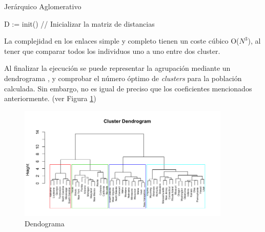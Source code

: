 		\begin{algorithm}[!h]
			\caption{Jerárquico Aglomerativo}
			D := init() // Inicializar la matriz de distancias\\
			
		\end{algorithm}
		\vspace{-0.20cm}

		\noindent La complejidad en los enlaces simple y completo tienen un coste cúbico O(\(N^{3}\)), al tener que comparar todos los individuos uno a uno entre dos cluster.
		
		\newpage


		Al finalizar la ejecución se puede representar la agrupación mediante un dendrograma \cite{espinoza2012using}, y comprobar el número óptimo de \textit{clusters} para la población calculada. Sin embargo, no es igual de preciso que los coeficientes mencionados anteriormente. (ver Figura \ref{fig:dendograma})
		
		\begin{figure}[!h]
			\centering
			\includegraphics[width=0.9\textwidth]{images/chapter_2/dendograma}
			\caption{Dendograma}
			\label{fig:dendograma}
		\end{figure}


